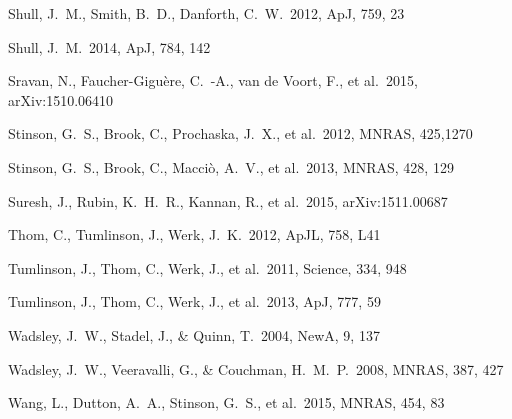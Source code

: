 \documentclass[useAMS,usenatbib]{mn2e}
\def \apj {ApJ}
\def \apjl {ApJL}
\def \mnras {MNRAS}
\def \na {NewA}
\begin{document}
\begin{thebibliography}{}
Shull, J.~M., Smith, B.~D., Danforth, C.~W.\ 2012, \apj, 759, 23

%
Shull, J.~M.\ 2014, \apj, 784, 142

 Sravan, N., Faucher-Gigu{\`e}re, C.~-A., van de Voort, F., et al.\ 2015, arXiv:1510.06410

%
 Stinson, G.~S., Brook, C., Prochaska, J.~X., et al.\ 2012, \mnras, 425,1270

 Stinson, G.~S., Brook, 
C., Macci{\`o}, A.~V., et al.\ 2013, \mnras, 428, 129 

%
 Suresh, J., Rubin, K.~H.~R., Kannan, R., et al.\ 2015, arXiv:1511.00687



Thom, C., Tumlinson, J., Werk, J.~K.\ 2012, \apjl, 758, L41

 Tumlinson, J., Thom, C., Werk, J., et al.\ 2011, Science, 334, 948

 Tumlinson, J., Thom, C., Werk, J., et al.\ 2013, \apj, 777, 59





 Wadsley, J.~W., Stadel, 
J., \& Quinn, T.\ 2004, \na, 9, 137 

 Wadsley, J.~W., 
Veeravalli, G., \& Couchman, H.~M.~P.\ 2008, \mnras, 387, 427 

 Wang, L., Dutton, A.~A.,  Stinson, G.~S., et al.\ 2015, \mnras, 454, 83
  

\end{thebibliography}
\end{document}
